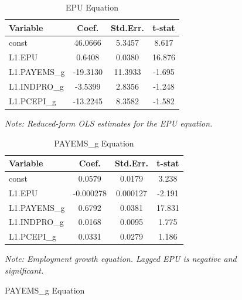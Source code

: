 \documentclass[11pt]{article}
\begin{document}
\begin{figure}[H]
\centering

\begin{minipage}{0.48\textwidth}
\begin{table}[H]
\centering
\caption{EPU Equation}
\label{tab:var_epu}
\begin{tabular}{lccc}
\hline
Variable & Coef. & Std.Err. & t-stat \\
\hline
const        & 46.0666  & 5.3457  & 8.617 \\
L1.EPU       & 0.6408   & 0.0380  & 16.876 \\
L1.PAYEMS\_g & -19.3130 & 11.3933 & -1.695 \\
L1.INDPRO\_g & -3.5399  & 2.8356  & -1.248 \\
L1.PCEPI\_g  & -13.2245 & 8.3582  & -1.582 \\
\hline
\end{tabular}
\begin{flushleft}
\footnotesize \textit{Note: Reduced-form OLS estimates for the EPU equation.}
\end{flushleft}
\end{table}
\end{minipage}
\hfill
\begin{minipage}{0.48\textwidth}
\begin{table}[H]
\centering
\caption{PAYEMS\_g Equation}
\label{tab:var_payems}
\begin{tabular}{lccc}
\hline
Variable & Coef. & Std.Err. & t-stat \\
\hline
const        & 0.0579    & 0.0179   & 3.238 \\
L1.EPU       & -0.000278 & 0.000127 & -2.191 \\
L1.PAYEMS\_g & 0.6792    & 0.0381   & 17.831 \\
L1.INDPRO\_g & 0.0168    & 0.0095   & 1.775 \\
L1.PCEPI\_g  & 0.0331    & 0.0279   & 1.186 \\
\hline
\end{tabular}
\begin{flushleft}
\footnotesize \textit{Note: Employment growth equation. Lagged EPU is negative and significant.}
\end{flushleft}
\end{table}
\end{minipage}

\vspace{1em}


\end{figure}
\end{document}

